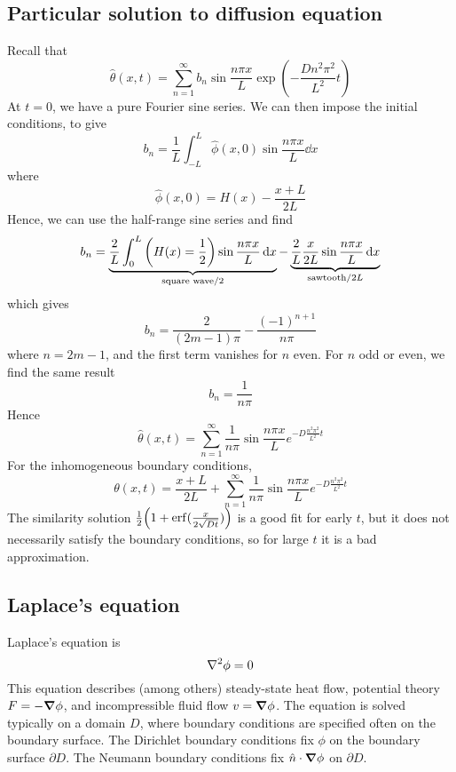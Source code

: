 \subsection{Particular solution to diffusion equation}
Recall that
\[
	\hat \theta(x,t) = \sum_{n=1}^\infty b_n \sin \frac{n \pi x}{L} \exp(-\frac{Dn^2 \pi^2}{L^2} t )
\]
At \( t = 0 \), we have a pure Fourier sine series.
We can then impose the initial conditions, to give
\[
	b_n = \frac{1}{L} \int_{-L}^L \hat \phi(x,0) \sin \frac{n \pi x}{L} \dd{x}
\]
where
\[
	\hat\phi(x,0) = H(x) - \frac{x+L}{2L}
\]
Hence, we can use the half-range sine series and find
\[
	b_n = \underbrace{ \frac{2}{L} \int_0^L \qty(H(x) = \frac{1}{2}) \sin \frac{n \pi x}{L} \dd{x} }_{\text{square wave}/2} - \underbrace{ \frac{2}{L}\frac{x}{2L} \sin \frac{n \pi x}{L} \dd{x} }_{\text{sawtooth}/2L}
\]
which gives
\[
	b_n = \frac{2}{(2m-1)\pi} - \frac{(-1)^{n+1}}{n\pi}
\]
where \( n = 2m - 1 \), and the first term vanishes for \( n \) even.
For \( n \) odd or even, we find the same result
\[
	b_n = \frac{1}{n\pi}
\]
Hence
\[
	\hat\theta(x,t) = \sum_{n=1}^\infty \frac{1}{n \pi} \sin \frac{n \pi x}{L} e^{-D \frac{n^2 \pi^2}{L^2} t}
\]
For the inhomogeneous boundary conditions,
\[
	\theta(x,t) = \frac{x+L}{2L} + \sum_{n=1}^\infty \frac{1}{n \pi} \sin \frac{n \pi x}{L} e^{-D \frac{n^2 \pi^2}{L^2} t}
\]
The similarity solution \( \frac{1}{2}\qty(1 + \erf(\frac{x}{2\sqrt{Dt}})) \) is a good fit for early \( t \), but it does not necessarily satisfy the boundary conditions, so for large \( t \) it is a bad approximation.

\subsection{Laplace's equation}
Laplace's equation is
\[
	\laplacian \phi = 0
\]
This equation describes (among others) steady-state heat flow, potential theory \( F = -\grad{\phi} \), and incompressible fluid flow \( v = \grad{\phi} \).
The equation is solved typically on a domain \( D \), where boundary conditions are specified often on the boundary surface.
The Dirichlet boundary conditions fix \( \phi \) on the boundary surface \( \partial D \).
The Neumann boundary conditions fix \( \hat n \cdot \grad{\phi} \) on \( \partial D \).

